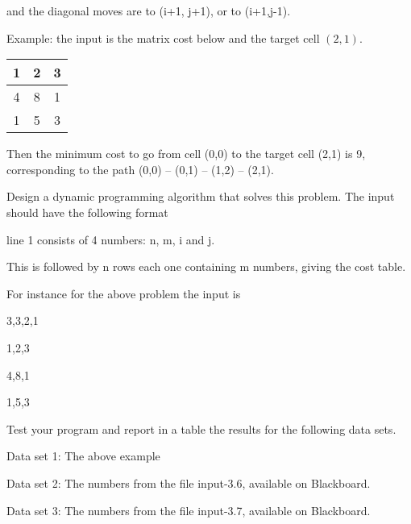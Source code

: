 \documentclass[11pt]{article}
\begin{document}
 and the diagonal moves are to (i+1, j+1), or to  (i+1,j-1).

\medskip

Example:  the input is the matrix cost below and the target cell $(2,1)$.
\medskip


\begin{tabular}{|c|c|c|}
\hline
1  & 2 & 3 \\
\hline
4 & 8 & 1 \\
\hline
1 & 5 & 3 \\
\hline

\end{tabular}
\medskip

Then the minimum cost to go from cell (0,0) to the target cell (2,1) is 9, corresponding to the path (0,0) -- (0,1) -- (1,2) -- (2,1).


Design a dynamic programming algorithm that solves this problem. The input should have the following format

line 1 consists of 4 numbers: n, m, i and j.

This is followed by n rows each one containing m numbers, giving the cost table.

For instance for the above problem the input is

3,3,2,1

1,2,3

4,8,1

1,5,3


Test your program and report in a table the results for the following data sets.

Data set 1:  The above example

Data set 2:  The  numbers from the file input-3.6, available on Blackboard. 

Data set 3:  The  numbers from the file input-3.7, available on Blackboard. 
\end{document}

